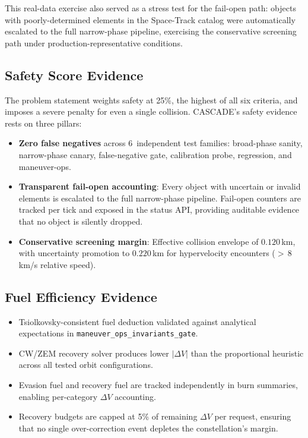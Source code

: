 \documentclass[10pt,twocolumn,letterpaper]{article}
\begin{document}
\noindent
This real-data exercise also served as a stress test for the fail-open
path: objects with poorly-determined elements in the Space-Track catalog
were automatically escalated to the full narrow-phase pipeline, exercising
the conservative screening path under production-representative conditions.

\subsection{Safety Score Evidence}

The problem statement weights safety at 25\%, the highest of all six
criteria, and imposes a severe penalty for even a single collision.
CASCADE's safety evidence rests on three pillars:

\begin{itemize}[nosep,leftmargin=*]
  \item \textbf{Zero false negatives} across 6~independent test families:
    broad-phase sanity, narrow-phase canary, false-negative gate,
    calibration probe, regression, and maneuver-ops.
  \item \textbf{Transparent fail-open accounting}: Every object with
    uncertain or invalid elements is escalated to the full narrow-phase
    pipeline.  Fail-open counters are tracked per tick and exposed in the
    status API, providing auditable evidence that no object is silently
    dropped.
  \item \textbf{Conservative screening margin}: Effective collision
    envelope of $0.120$\,km, with uncertainty promotion to $0.220$\,km for
    hypervelocity encounters ($>$\,8\,km/s relative speed).
\end{itemize}

\subsection{Fuel Efficiency Evidence}

\begin{itemize}[nosep,leftmargin=*]
  \item Tsiolkovsky-consistent fuel deduction validated against
    analytical expectations in \texttt{maneuver\_ops\_invariants\_gate}.
  \item CW/ZEM recovery solver produces lower $|\Delta V|$ than the
    proportional heuristic across all tested orbit configurations.
  \item Evasion fuel and recovery fuel are tracked independently in burn
    summaries, enabling per-category $\Delta V$ accounting.
  \item Recovery budgets are capped at 5\% of remaining $\Delta V$
    per request, ensuring that no single over-correction event depletes
    the constellation's margin.
\end{itemize}
\end{document}
